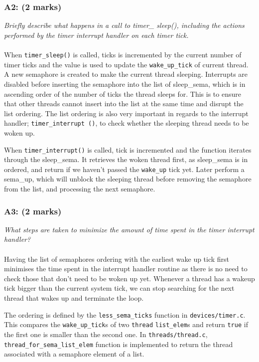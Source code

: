 \documentclass{article}
\begin{document}
\subsubsection*{A2: (2 marks) }
\textit{Briefly describe what happens in a call to timer\_ sleep(), including the actions performed by the timer interrupt handler on each timer tick.}
\\ \\
When \texttt{timer\_sleep()} is called, ticks is incremented by the current number of timer ticks and the value is used to update the \texttt{wake\_up\_tick} of current thread. A new semaphore is created to make the current thread sleeping. Interrupts are disabled before inserting the semaphore into the list of sleep\_sema, which is in ascending order of the number of ticks the thread sleeps for. This is to ensure that other threads cannot insert into the list at the same time and disrupt the list ordering. The list ordering is also very important in regards to the interrupt handler; \texttt{timer\_interrupt ()}, to check
whether the sleeping thread needs to be woken up.
\par
When \texttt{timer\_interrupt()} is called, tick is incremented and the function iterates through the sleep\_sema. It retrieves the woken thread first, as sleep\_sema is  in ordered, and return if we haven't passed the \texttt{wake\_up} tick yet. Later perform a sema\_up, which will unblock the sleeping thread before removing the semaphore from the list, and processing the next semaphore.

\subsubsection*{A3: (2 marks) }
\textit{What steps are taken to minimize the amount of time spent in the timer interrupt handler?}
\\ \\
Having the list of semaphores ordering with the earliest wake up tick first minimises the time spent in the interrupt handler routine as there is no need to check those that don’t need to be woken up yet. Whenever a thread has a wakeup tick bigger than the current system tick, we can stop searching for the next thread that wakes up and terminate the loop.
\par
The ordering is defined by the \texttt{less\_sema\_ticks} function in  \texttt{devices/timer.c}. This
compares the \texttt{wake\_up\_tick}s of two \texttt{thread} \texttt{list\_elem}s and return \texttt{true} if the first one is smaller than the second one. In \texttt{threads/thread.c},  \texttt{thread\_for\_sema\_list\_elem} function is implemented to return the thread associated with a semaphore element of a list.
\end{document}
